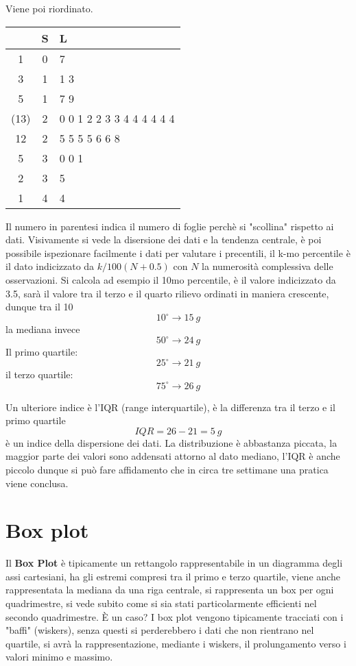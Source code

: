 Viene poi riordinato.
\begin{table}[h]
    \centering
    \begin{tabular}{c| c|l}
      &  S & L \\ \hline
    1  &  0 & 7 \\ \hline
    3  &  1 & 1 3 \\ \hline
    5  &  1 & 7 9 \\ \hline
    (13) &  2 & 0 0 1 2 2 3 3 4 4 4 4 4 4  \\ \hline
    12  &  2 & 5 5 5 5 6 6 8\\ \hline
    5  &  3 & 0 0 1 \\ \hline
    2  &  3 & 5 \\ \hline
    1  &  4 & 4
    \end{tabular}
\end{table}
Il numero in parentesi indica il numero di foglie perchè si "scollina" rispetto 
ai dati.
Visivamente si vede la disersione dei dati e la tendenza centrale, è poi 
possibile ispezionare facilmente i dati per valutare i precentili, il k-mo 
percentile è il dato indicizzato da $k/100(N + 0.5 )$ con $N$ la numerosità 
complessiva delle osservazioni.
Si calcola ad esempio il 10mo percentile, è il valore indicizzato da 3.5, sarà 
il valore tra il terzo e il quarto rilievo ordinati in maniera crescente, 
dunque tra il 10 
$$
10^\circ \rightarrow 15\ g
$$
la mediana invece
$$
50^\circ \rightarrow 24\ g
$$
Il primo quartile:
$$
25^\circ \rightarrow 21\ g
$$
il terzo quartile:
$$
75^\circ \rightarrow 26\ g
$$

Un ulteriore indice è l'IQR (range interquartile), è la differenza tra il terzo 
e il primo quartile
$$
IQR = 26 - 21 = 5\ g
$$
è un indice della dispersione dei dati.
La distribuzione è abbastanza piccata, la maggior parte dei valori sono 
addensati attorno al dato mediano, l'IQR è anche piccolo dunque si può fare 
affidamento che in circa tre settimane una pratica viene conclusa.

\section{Box plot}
Il \textbf{Box Plot} è tipicamente un rettangolo rappresentabile in un 
diagramma degli assi cartesiani, ha gli estremi compresi tra il primo e terzo 
quartile, viene anche rappresentata la mediana da una riga centrale, si 
rappresenta un box per ogni quadrimestre, si vede subito come si sia stati 
particolarmente efficienti nel secondo quadrimestre.
È un caso? I box plot vengono tipicamente tracciati con i "baffi" (wiskers), 
senza questi si perderebbero i dati che non rientrano nel quartile, si avrà la 
rappresentazione, mediante i wiskers, il prolungamento verso i valori minimo e 
massimo.

